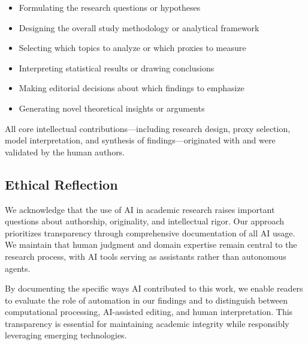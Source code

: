 \begin{itemize}
    \item Formulating the research questions or hypotheses
    \item Designing the overall study methodology or analytical framework
    \item Selecting which topics to analyze or which proxies to measure
    \item Interpreting statistical results or drawing conclusions
    \item Making editorial decisions about which findings to emphasize
    \item Generating novel theoretical insights or arguments
\end{itemize}

All core intellectual contributions—including research design, proxy selection, model interpretation, and synthesis of findings—originated with and were validated by the human authors.

\subsection{Ethical Reflection}

We acknowledge that the use of AI in academic research raises important questions about authorship, originality, and intellectual rigor. Our approach prioritizes transparency through comprehensive documentation of all AI usage. We maintain that human judgment and domain expertise remain central to the research process, with AI tools serving as assistants rather than autonomous agents.

By documenting the specific ways AI contributed to this work, we enable readers to evaluate the role of automation in our findings and to distinguish between computational processing, AI-assisted editing, and human interpretation. This transparency is essential for maintaining academic integrity while responsibly leveraging emerging technologies.